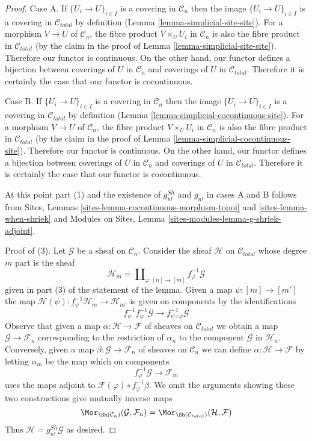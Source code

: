 \begin{proof}
Case A. If $\{U_i \to U\}_{i \in I}$ is a covering in $\mathcal{C}_n$
then the image $\{U_i \to U\}_{i \in I}$ is a covering in $\mathcal{C}_{total}$
by definition (Lemma \ref{lemma-simplicial-site-site}). For a morphism
$V \to U$ of $\mathcal{C}_n$, the fibre product
$V \times_U U_i$ in $\mathcal{C}_n$ is also
the fibre product in $\mathcal{C}_{total}$ (by the claim in the
proof of Lemma \ref{lemma-simplicial-site-site}).
Therefore our functor is continuous. On the other hand, our functor
defines a bijection between coverings of $U$ in $\mathcal{C}_n$
and coverings of $U$ in $\mathcal{C}_{total}$. Therefore it is
certainly the case that our functor is cocontinuous.

\medskip\noindent
Case B. If $\{U_i \to U\}_{i \in I}$ is a covering in $\mathcal{C}_n$
then the image $\{U_i \to U\}_{i \in I}$ is a covering in $\mathcal{C}_{total}$
by definition (Lemma \ref{lemma-simplicial-cocontinuous-site}). For a morphism
$V \to U$ of $\mathcal{C}_n$, the fibre product
$V \times_U U_i$ in $\mathcal{C}_n$ is also
the fibre product in $\mathcal{C}_{total}$ (by the claim in the
proof of Lemma \ref{lemma-simplicial-cocontinuous-site}).
Therefore our functor is continuous. On the other hand, our functor
defines a bijection between coverings of $U$ in $\mathcal{C}_n$
and coverings of $U$ in $\mathcal{C}_{total}$. Therefore it is
certainly the case that our functor is cocontinuous.

\medskip\noindent
At this point part (1) and the existence of $g^{Sh}_{n!}$ and $g_{n!}$
in cases A and B follows from
Sites, Lemmas \ref{sites-lemma-cocontinuous-morphism-topoi} and
\ref{sites-lemma-when-shriek}
and
Modules on Sites, Lemma \ref{sites-modules-lemma-g-shriek-adjoint}.

\medskip\noindent
Proof of (3). Let $\mathcal{G}$ be a sheaf on $\mathcal{C}_n$.
Consider the sheaf $\mathcal{H}$ on $\mathcal{C}_{total}$
whose degree $m$ part is the sheaf
$$
\mathcal{H}_m = \coprod\nolimits_{\varphi : [n] \to [m]}
f_\varphi^{-1}\mathcal{G}
$$
given in part (3) of the statement of the lemma.
Given a map $\psi : [m] \to [m']$ the map
$\mathcal{H}(\psi) : f_\psi^{-1}\mathcal{H}_m \to \mathcal{H}_{m'}$
is given on components by the identifications
$$
f_\psi^{-1} f_\varphi^{-1} \mathcal{G} \to
f_{\psi \circ \varphi}^{-1}\mathcal{G}
$$
Observe that given a map $\alpha : \mathcal{H} \to \mathcal{F}$
of sheaves on $\mathcal{C}_{total}$ we obtain a map
$\mathcal{G} \to \mathcal{F}_n$
corresponding to the restriction of $\alpha_n$ to the component
$\mathcal{G}$ in $\mathcal{H}_n$. Conversely, given a map
$\beta : \mathcal{G} \to \mathcal{F}_n$ of sheaves on $\mathcal{C}_n$
we can define
$\alpha : \mathcal{H} \to \mathcal{F}$ by letting $\alpha_m$
be the map which on components
$$
f_\varphi^{-1}\mathcal{G} \to \mathcal{F}_m
$$
uses the maps adjoint to $\mathcal{F}(\varphi) \circ f_\varphi^{-1}\beta$.
We omit the arguments showing these two constructions give
mutually inverse maps
$$
\Mor_{\Sh(\mathcal{C}_n)}(\mathcal{G}, \mathcal{F}_n) =
\Mor_{\Sh(\mathcal{C}_{total})}(\mathcal{H}, \mathcal{F})
$$
Thus $\mathcal{H} = g^{Sh}_{n!}\mathcal{G}$ as desired.


\end{proof}
